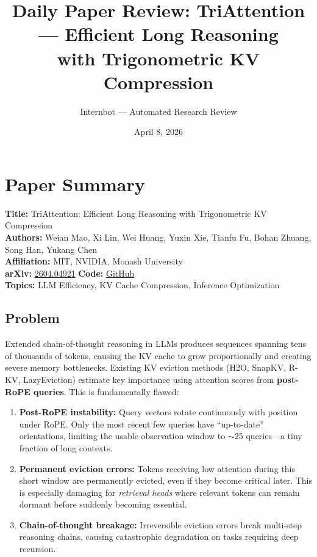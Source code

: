 \documentclass[11pt]{article}
\title{Daily Paper Review: TriAttention --- Efficient Long Reasoning\\with Trigonometric KV Compression}
\author{Internbot --- Automated Research Review}
\date{April 8, 2026}
\begin{document}
\maketitle

\section{Paper Summary}

\textbf{Title:} TriAttention: Efficient Long Reasoning with Trigonometric KV Compression \\
\textbf{Authors:} Weian Mao, Xi Lin, Wei Huang, Yuxin Xie, Tianfu Fu, Bohan Zhuang, Song Han, Yukang Chen \\
\textbf{Affiliation:} MIT, NVIDIA, Monash University \\
\textbf{arXiv:} \href{https://arxiv.org/abs/2604.04921}{2604.04921} \quad \textbf{Code:} \href{https://github.com/WeianMao/triattention}{GitHub} \\
\textbf{Topics:} LLM Efficiency, KV Cache Compression, Inference Optimization

\subsection{Problem}

Extended chain-of-thought reasoning in LLMs produces sequences spanning tens of thousands of tokens, causing the KV cache to grow proportionally and creating severe memory bottlenecks. Existing KV eviction methods (H2O, SnapKV, R-KV, LazyEviction) estimate key importance using attention scores from \textbf{post-RoPE queries}. This is fundamentally flawed:

\begin{enumerate}
    \item \textbf{Post-RoPE instability:} Query vectors rotate continuously with position under RoPE. Only the most recent few queries have ``up-to-date'' orientations, limiting the usable observation window to $\sim$25 queries---a tiny fraction of long contexts.
    \item \textbf{Permanent eviction errors:} Tokens receiving low attention during this short window are permanently evicted, even if they become critical later. This is especially damaging for \textit{retrieval heads} where relevant tokens can remain dormant before suddenly becoming essential.
    \item \textbf{Chain-of-thought breakage:} Irreversible eviction errors break multi-step reasoning chains, causing catastrophic degradation on tasks requiring deep recursion.
\end{enumerate}
\end{document}
